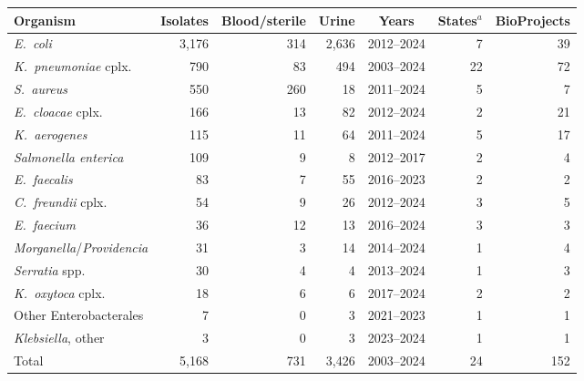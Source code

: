 \begin{tabular}{lrrrcrr}
\hline\hline
Organism & Isolates & Blood/sterile & Urine & Years & States$^{a}$ & BioProjects \\
\hline
\textit{E.~coli} & 3{,}176 & 314 & 2{,}636 & 2012--2024 & 7 & 39 \\
\textit{K.~pneumoniae} cplx. & 790 & 83 & 494 & 2003--2024 & 22 & 72 \\
\textit{S.~aureus} & 550 & 260 & 18 & 2011--2024 & 5 & 7 \\
\textit{E.~cloacae} cplx. & 166 & 13 & 82 & 2012--2024 & 2 & 21 \\
\textit{K.~aerogenes} & 115 & 11 & 64 & 2011--2024 & 5 & 17 \\
\textit{Salmonella enterica} & 109 & 9 & 8 & 2012--2017 & 2 & 4 \\
\textit{E.~faecalis} & 83 & 7 & 55 & 2016--2023 & 2 & 2 \\
\textit{C.~freundii} cplx. & 54 & 9 & 26 & 2012--2024 & 3 & 5 \\
\textit{E.~faecium} & 36 & 12 & 13 & 2016--2024 & 3 & 3 \\
\textit{Morganella}/\textit{Providencia} & 31 & 3 & 14 & 2014--2024 & 1 & 4 \\
\textit{Serratia} spp. & 30 & 4 & 4 & 2013--2024 & 1 & 3 \\
\textit{K.~oxytoca} cplx. & 18 & 6 & 6 & 2017--2024 & 2 & 2 \\
Other Enterobacterales & 7 & 0 & 3 & 2021--2023 & 1 & 1 \\
\textit{Klebsiella}, other & 3 & 0 & 3 & 2023--2024 & 1 & 1 \\
\hline
Total & 5{,}168 & 731 & 3{,}426 & 2003--2024 & 24 & 152 \\
\hline\hline
\end{tabular}
